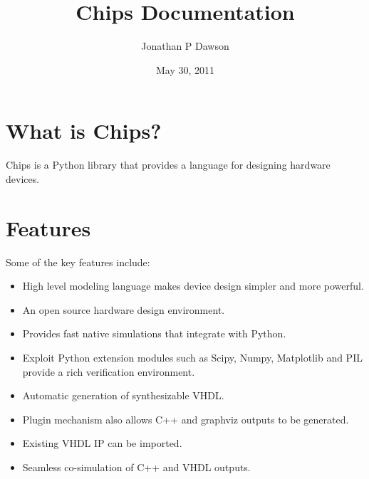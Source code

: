 \documentclass[letterpaper,10pt,english]{sphinxmanual}
\title{Chips Documentation}
\date{May 30, 2011}
\author{Jonathan P Dawson}
\begin{document}
\maketitle
\tableofcontents
{}\label{index::doc}



\chapter{What is Chips?}
\label{index:chips-hardware-design-in-python}\label{index:what-is-chips}
Chips is a Python library that provides a language for designing hardware
devices.


\chapter{Features}
\label{index:features}
Some of the key features include:
\begin{itemize}
\item {} 
High level modeling language makes device design simpler and more
powerful.

\item {} 
An open source hardware design environment.

\item {} 
Provides fast native simulations that integrate with Python.

\item {} 
Exploit Python extension modules such as Scipy, Numpy, Matplotlib and PIL
provide a rich verification environment.

\item {} 
Automatic generation of synthesizable VHDL.

\item {} 
Plugin mechanism also allows C++ and graphviz outputs to be generated.

\item {} 
Existing VHDL IP can be imported.

\item {} 
Seamless co-simulation of C++ and VHDL outputs.

\end{itemize}
\end{document}
